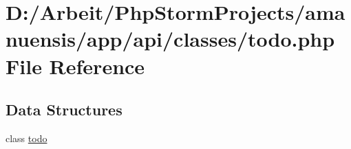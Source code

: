 \hypertarget{a00078}{}\section{D\+:/\+Arbeit/\+Php\+Storm\+Projects/amanuensis/app/api/classes/todo.php File Reference}
\label{a00078}
\subsection*{Data Structures}
\begin{DoxyCompactItemize}
\item 
class \hyperlink{a00048}{todo}
\end{DoxyCompactItemize}
